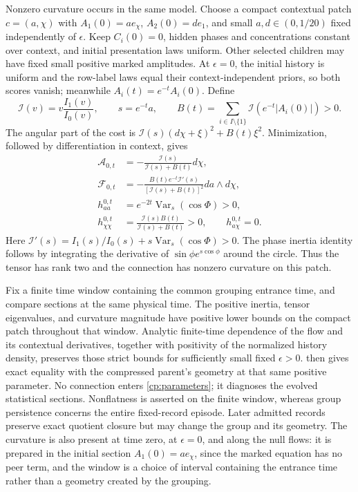 Nonzero curvature occurs in the same model. Choose a compact contextual patch $c=(a,\chi)$ with $A_1(0)=ae_\chi$, $A_2(0)=de_1$, and small $a,d\in(0,1/20)$ fixed independently of $\epsilon$. Keep $C_i(0)=0$, hidden phases and concentrations constant over context, and initial presentation laws uniform. Other selected children may have fixed small positive marked amplitudes. At $\epsilon=0$, the initial history is uniform and the row-label laws equal their context-independent priors, so both scores vanish; meanwhile $A_i(t)=e^{-t}A_i(0)$. Define
\begin{equation}
 \mathcal I(v)=v\frac{I_1(v)}{I_0(v)},\qquad
 s=e^{-t}a,\qquad
 B(t)=\sum_{i\in I\setminus\{1\}}\mathcal I(e^{-t}|A_i(0)|)>0.
 \label{cp:inertias}
\end{equation}
The angular part of the cost is $\mathcal I(s)(d\chi+\xi)^2+B(t)\xi^2$. Minimization, followed by differentiation in context, gives
\begin{equation}
 \begin{aligned}
 \mathcal A_{0,t}&=-\frac{\mathcal I(s)}{\mathcal I(s)+B(t)}d\chi,\\
 \mathcal F_{0,t}&=-\frac{B(t)e^{-t}\mathcal I'(s)}
 {[\mathcal I(s)+B(t)]^2}da\wedge d\chi,\\
 h_{aa}^{0,t}&=e^{-2t}\operatorname{Var}_{s}(\cos\Phi)>0,\\
 h_{\chi\chi}^{0,t}&=\frac{\mathcal I(s)B(t)}{\mathcal I(s)+B(t)}>0,
 \qquad h_{a\chi}^{0,t}=0.
 \end{aligned}
 \label{cp:curvature}
\end{equation}
Here $\mathcal I'(s)=I_1(s)/I_0(s)+s\operatorname{Var}_{s}(\cos\Phi)>0$. The phase inertia identity follows by integrating the derivative of $\sin\phi e^{s\cos\phi}$ around the circle. Thus the tensor has rank two and the connection has nonzero curvature on this patch.

Fix a finite time window containing the common grouping entrance time, and compare sections at the same physical time. The positive inertia, tensor eigenvalues, and curvature magnitude have positive lower bounds on the compact patch throughout that window. Analytic finite-time dependence of the flow and its contextual derivatives, together with positivity of the normalized history density, preserves those strict bounds for sufficiently small fixed $\epsilon>0$.  then gives exact equality with the compressed parent's geometry at that same positive parameter. No connection enters \cref{cp:parameters}; it diagnoses the evolved statistical sections. Nonflatness is asserted on the finite window, whereas group persistence concerns the entire fixed-record episode. Later admitted records preserve exact quotient closure but may change the group and its geometry. The curvature is also present at time zero, at $\epsilon=0$, and along the null flows: it is prepared in the initial section $A_1(0)=ae_\chi$, since the marked equation has no peer term, and the window is a choice of interval containing the entrance time rather than a geometry created by the grouping.

